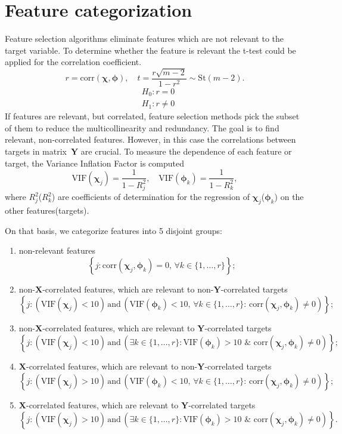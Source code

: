 \documentclass[12pt,twoside]{article}
\newcommand{\bY}{\mathbf{Y}}
\newcommand{\bX}{\mathbf{X}}
\newcommand{\bchi}{\boldsymbol{\chi}}
\newcommand{\bphi}{\boldsymbol{\phi}}
\begin{document}
\section{Feature categorization}
Feature selection algorithms eliminate features which are not relevant to the target variable. 
To determine whether the feature is relevant the t-test could be applied for the correlation coefficient.
\[
	r = \text{corr} (\bchi, \bphi), \quad t = \frac{r \sqrt{m - 2}}{1 - r^2} \sim \text{St} (m - 2).
\]
\begin{align*}
&H_0: r = 0 \\
&H_1: r \neq 0
\end{align*}
If features are relevant, but correlated, feature selection methods pick the subset of them to reduce the multicollinearity and redundancy.
The goal is to find relevant, non-correlated features. 
However, in this case the correlations between targets in matrix~$\bY$ are crucial.
To measure the dependence of each feature or target, the Variance Inflation Factor is computed
\[
	\text{VIF}(\bchi_j) = \frac{1}{1 - R_j^2}, \quad \text{VIF}(\bphi_k) = \frac{1}{1 - R_k^2},
\]
where $R_j^2$($R_k^2$) are coefficients of determination for the regression of $\bchi_j$($\bphi_k$) on the other features(targets).

On that basis, we categorize features into 5 disjoint groups:
\begin{enumerate}
	\item non-relevant features
	\[
		\left\{j: \text{corr}(\bchi_j, \bphi_k) = 0, \, \forall k \in \{1, \dots, r\}\right\};
	\]
	\item non-$\bX$-correlated features, which are relevant to non-$\bY$-correlated targets
	\[
		\left\{j: \left(\text{VIF}(\bchi_j) < 10\right) \, \text{and} \, \left(\text{VIF}(\bphi_k) < 10 , \, \forall k \in \{1, \dots, r\}: \,  \text{corr}(\bchi_j, \bphi_k) \neq 0 \right)\right\};
	\]
	\item non-$\bX$-correlated features, which are relevant to $\bY$-correlated targets
	\[
		\left\{j: \left(\text{VIF}(\bchi_j) < 10\right) \, \text{and} \, \left( \exists k \in \{1, \dots, r\}: \text{VIF}(\bphi_k) > 10 \,\, \& \,\, \text{corr}(\bchi_j, \bphi_k) \neq 0 \right)\right\};
	\]
	\item $\bX$-correlated features, which are relevant to non-$\bY$-correlated targets
	\[
		\left\{j: \left(\text{VIF}(\bchi_j) > 10\right) \, \text{and} \, \left(\text{VIF}(\bphi_k) < 10 , \, \forall k \in \{1, \dots, r\}: \,  \text{corr}(\bchi_j, \bphi_k) \neq 0 \right)\right\};
	\]
	\item $\bX$-correlated features, which are relevant to $\bY$-correlated targets
	\[
		\left\{j: \left(\text{VIF}(\bchi_j) > 10\right) \, \text{and} \, \left( \exists k \in \{1, \dots, r\}: \text{VIF}(\bphi_k) > 10 \,\, \& \,\, \text{corr}(\bchi_j, \bphi_k) \neq 0 \right)\right\}.
	\]
\end{enumerate}
\end{document}
